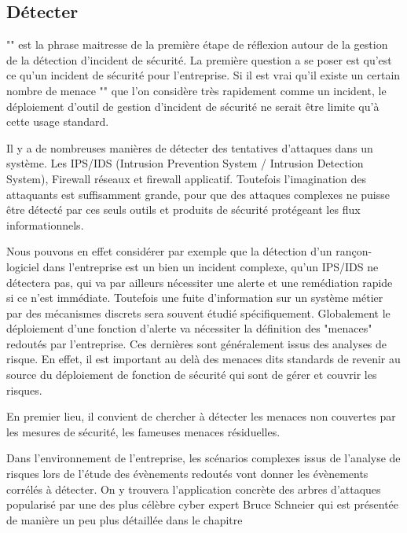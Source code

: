 \subsection{Détecter}


"" est la phrase maitresse de la première étape de réflexion autour de la gestion de la détection d'incident de sécurité.
La première question a se poser est qu'est ce qu'un incident de sécurité pour l'entreprise. Si il est vrai qu'il existe un certain nombre de menace "" que l'on considère très rapidement comme un incident, le déploiement d'outil de gestion d'incident de sécurité ne serait être limite qu'à cette usage standard.

Il y a de nombreuses manières de détecter des tentatives d'attaques dans un système. Les IPS/IDS (Intrusion Prevention System / Intrusion Detection System), Firewall réseaux et firewall applicatif. Toutefois l'imagination des attaquants est suffisamment grande, pour que des attaques complexes ne puisse être détecté par ces seuls outils et produits de sécurité protégeant les flux informationnels.

Nous pouvons en effet considérer par exemple que la détection d'un rançon-logiciel dans l'entreprise est un bien un incident complexe, qu'un IPS/IDS ne détectera pas,  qui va par ailleurs nécessiter une alerte et une remédiation rapide si ce n'est immédiate.
Toutefois une fuite d'information sur un système métier par des mécanismes discrets sera souvent étudié spécifiquement.
Globalement le déploiement d'une fonction d'alerte va nécessiter la définition des "menaces" redoutés par l'entreprise. 
Ces dernières sont généralement issus des analyses de risque.
En effet, il est important au delà des menaces dits standards de revenir au source du déploiement de fonction de sécurité qui sont de gérer et couvrir les risques.

En premier lieu, il convient de chercher à détecter les menaces non couvertes par les mesures de sécurité, les fameuses menaces résiduelles.

Dans l'environnement de l'entreprise, les scénarios complexes issus de l'analyse de risques lors de l'étude des évènements redoutés vont donner les évènements corrélés à détecter.
On y trouvera l'application concrète des arbres d'attaques popularisé par une des plus célèbre cyber expert Bruce Schneier \cite{schneier1999attack} qui est présentée de manière un peu plus détaillée dans le chapitre 


